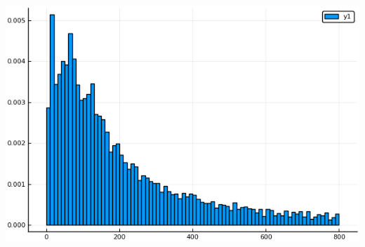 \documentclass[12pt, letterpaper]{paper}
\begin{document}
\begin{center}
\includegraphics[width=.9\linewidth]{histTwo.png}
\end{center}
\end{document}
